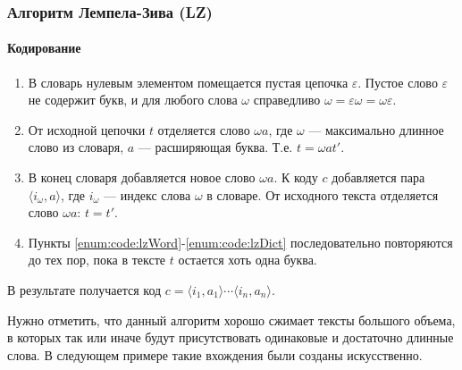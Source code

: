 \begin{frame}
    \frametitle{Алгоритм Лемпела-Зива (LZ)}
    \framesubtitle{Кодирование}
    
	\begin{enumerate}
		\item В словарь нулевым элементом помещается пустая цепочка $\varepsilon$. Пустое слово $\varepsilon$ не содержит букв, и для любого слова $\omega$ справедливо $\omega=\varepsilon\omega=\omega\varepsilon$.
        
        \item\label{enum:code:lzWord} От исходной цепочки $t$ отделяется слово $\omega a$, где $\omega$ --- максимально длинное слово из словаря, $a$ --- расширяющая буква. Т.е. $t=\omega at'$.
        
        \item\label{enum:code:lzDict} В конец словаря добавляется новое слово $\omega a$. К коду $c$ добавляется пара $\langle i_{\omega},a\rangle$, где $i_{\omega}$ --- индекс слова $\omega$ в словаре. От исходного текста отделяется слово $\omega a$: $t=t'$.
        
        \item Пункты \ref{enum:code:lzWord}-\ref{enum:code:lzDict} последовательно повторяются до тех пор, пока в тексте $t$ остается хоть одна буква.
	\end{enumerate}
    В результате получается код $c=\langle i_1,a_1\rangle\cdots\langle i_n,a_n\rangle$.
\end{frame}

Нужно отметить, что данный алгоритм хорошо сжимает тексты большого объема, в которых так или иначе будут присутствовать одинаковые и достаточно длинные слова. В следующем примере такие вхождения были созданы искусственно.

